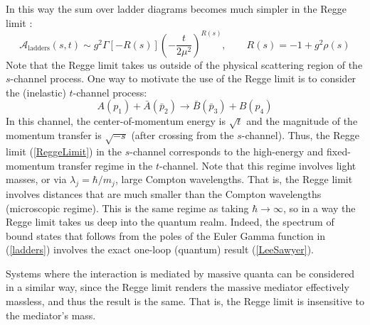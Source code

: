 In this way the sum over ladder diagrams becomes much simpler in the Regge limit \cite{LeeSawyer}:
\begin{equation}
	\mathcal{A}_{\text{ladders}}(s, t) \sim g^{2} \Gamma[-R(s)] \left(- \frac{t}{2 \mu^{2}} \right)^{R(s)}, \qquad R(s) = -1 + g^{2} \rho(s) \label{ladders}
\end{equation}
Note that the Regge limit takes us outside of the physical scattering region of the $s$-channel process. One way to motivate the use of the Regge limit is to consider the (inelastic) $t$-channel process:
\begin{equation}
	A(p_{1}) + \bar{A}(\bar{p}_{2}) \longrightarrow \bar{B}(\bar{p}_{3}) + B(p_{4})
\end{equation}
In this channel, the center-of-momentum energy is $\sqrt{t}$ and the magnitude of the momentum transfer is $\sqrt{-s}$ (after crossing from the $s$-channel). Thus, the Regge limit (\ref{ReggeLimit}) in the $s$-channel corresponds to the high-energy and fixed-momentum transfer regime in the $t$-channel. Note that this regime involves light masses, or via $\lambda_{j} = \hbar / m_{j}$, large Compton wavelengths. That is, the Regge limit involves distances that are much smaller than the Compton wavelengths (microscopic regime). This is the same regime as taking $\hbar \rightarrow \infty$, so in a way the Regge limit takes us deep into the quantum realm. Indeed, the spectrum of bound states that follows from the poles of the Euler Gamma function in (\ref{ladders}) involves the exact one-loop (quantum) result (\ref{LeeSawyer}).

Systems where the interaction is mediated by massive quanta can be considered in a similar way, since the Regge limit renders the massive mediator effectively massless, and thus the result is the same. That is, the Regge limit is insensitive to the mediator's mass.
